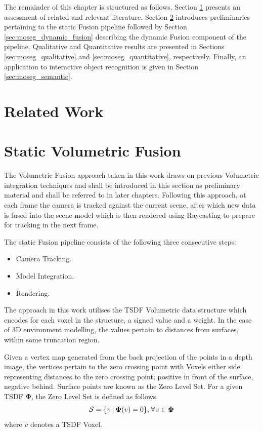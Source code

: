 The remainder of this chapter is structured as follows.
Section \ref{sec:moseg_related_work} presents an assessment of related and
relevant literature. Section \ref{sec:moseg_static_fusion} introduces
preliminaries pertaining to the static Fusion pipeline followed by Section
\ref{sec:moseg_dynamic_fusion} describing the dynamic Fusion component of the
pipeline. Qualitative and Quantitative results are presented in Sections
\ref{sec:moseg_qualitative} and \ref{sec:moseg_quantitative}, respectively.
Finally, an application to interactive object recognition is given in Section
\ref{sec:moseg_semantic}.

\section{Related Work}
\label{sec:moseg_related_work}

\section{Static Volumetric Fusion}
\label{sec:moseg_static_fusion}
The Volumetric Fusion approach taken in this work draws on previous Volumetric
integration techniques \cite{Curless1996, Newcombe2011, NieBner2013,
  Prisacariu2014}
and shall be introduced in this section as preliminary material and shall be
referred to in later chapters. Following this approach, at each frame the camera
is tracked against the current scene, after which new data is fused into the
scene model which is then rendered using Raycasting to prepare for tracking in
the next frame.

The static Fusion pipeline consists of the following three consecutive steps:
\begin{itemize}
  \item Camera Tracking.
  \item Model Integration.
  \item Rendering.
\end{itemize}

The approach in this work utilises the TSDF Volumetric data structure which
encodes for each voxel in the structure, a signed value and a weight.
In the case of 3D environment modelling, the values pertain to distances from
surfaces, within some truncation region.

Given a vertex map generated from the back projection of the points in a depth
image, the vertices pertain to the zero crossing point with Voxels either side
representing distances to the zero crossing point; positive in front of the
surface, negative behind. Surface points are known as the Zero Level Set.
For a given TSDF $\mathbf{\Phi}$, the Zero Level Set is defined as follows
\begin{equation}
  \label{eqn:zero_level_definition}
  \mathcal{S} = \{v \:\vert\: \mathbf{\Phi}(v) = 0\}, 
  \mkern2mu \forall \mkern2mu v \in \mathbf{\Phi}
\end{equation}
where $v$ denotes a TSDF Voxel.

